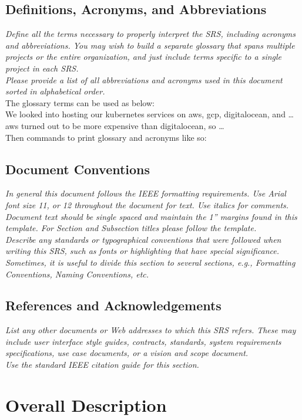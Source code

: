 \documentclass{article}
\newcommand{\gnl}{\vspace{1em}\\}      %
\begin{document}
    \subsection{Definitions, Acronyms, and Abbreviations}
        \emph{Define all the terms necessary to properly interpret the SRS, including acronyms and abbreviations. You may wish to build a separate glossary that spans multiple projects or the entire organization, and just include terms specific to a single project in each SRS.\gnl Please provide a list of all abbreviations and acronyms used in this document sorted in alphabetical order.}
        \gnl The glossary terms can be used as below:
        \\\hspace*{10mm} We looked into hosting our \gls{kubernetes} services on \gls{aws}, \gls{gcp}, \gls{digitalocean}, and \dots \Gls{aws} turned out to be more expensive than \gls{digitalocean}, so \dots
        \\ Then commands to print glossary and acronyms like so: 
        \printnoidxglossary
        \printnoidxglossary[type=acronym]
        \printacronyms
    \subsection{Document Conventions}
        \emph{In general this document follows the IEEE formatting requirements. Use Arial font size 11, or 12 throughout the document for text. Use italics for comments. Document text should be single spaced and maintain the 1” margins found in this template. For Section and Subsection titles please follow the template.\gnl Describe any standards or typographical conventions that were followed when writing this SRS, such as fonts or highlighting that have special significance. Sometimes, it is useful to divide this section to several sections, e.g., Formatting Conventions, Naming Conventions, etc.}
    \subsection{References and Acknowledgements}
        \emph{List any other documents or Web addresses to which this SRS refers. These may include user interface style guides, contracts, standards, system requirements specifications, use case documents, or a vision and scope document.\gnl Use the standard IEEE citation guide for this section.}

\pagebreak
\section{Overall Description}
\end{document}
